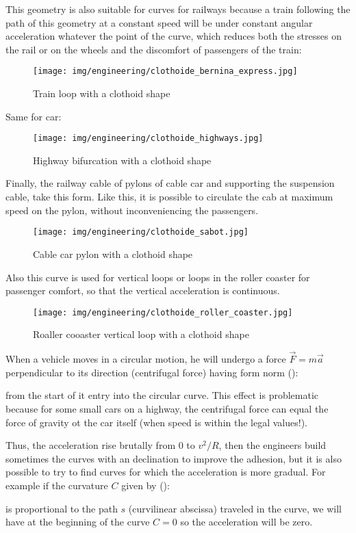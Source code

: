 	This geometry is also suitable for curves for railways because a train following the path of this geometry at a constant speed will be under constant angular acceleration whatever the point of the curve, which reduces both the stresses on the rail or on the wheels and the discomfort of passengers of the train:
	\begin{figure}[H]
		\centering
		\texttt{[image: img/engineering/clothoide\_bernina\_express.jpg]}
		\caption{Train loop with a clothoid shape}
	\end{figure}
	Same for car:
	\begin{figure}[H]
		\centering
		\texttt{[image: img/engineering/clothoide\_highways.jpg]}
		\caption{Highway bifurcation with a clothoid shape}
	\end{figure}
	Finally, the railway cable of pylons of cable car and supporting the suspension cable, take this form. Like this, it is possible to circulate the cab at maximum speed on the pylon, without inconveniencing the passengers.
	\begin{figure}[H]
		\centering
		\texttt{[image: img/engineering/clothoide\_sabot.jpg]}
		\caption{Cable car pylon with a clothoid shape}
	\end{figure}
	Also this curve is used for vertical loops or loops in the roller coaster for passenger comfort, so that the vertical acceleration is continuous.
	\begin{figure}[H]
		\centering
		\texttt{[image: img/engineering/clothoide\_roller\_coaster.jpg]}
		\caption{Roaller cooaster vertical loop with a clothoid shape}
	\end{figure}
	When a vehicle moves in a circular motion, he will undergo a force $\vec{F}=m\vec{a}$ perpendicular to its direction (centrifugal force) having form norm ():
	
	from the start of it entry into the circular curve. This effect is problematic because for some small cars on a highway, the centrifugal force can equal the force of gravity ot the car itself (when speed is within the legal values!).

	Thus, the acceleration rise brutally from $0$ to $v^2/R$, then the engineers build sometimes the curves with an declination to improve the adhesion, but it is also possible to try to find curves for which the acceleration is more gradual. For example if the curvature $C$ given by ():
	
	is proportional to the path $s$ (curvilinear abscissa) traveled in the curve, we will have at the beginning of the curve $C=0$ so the acceleration will be zero.

